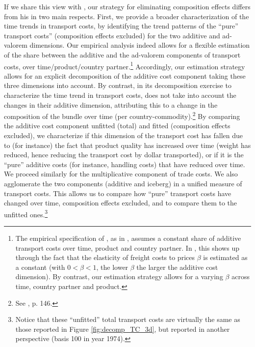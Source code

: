 \documentclass[a4paper,11pt]{article}
\begin{document}
If we share this view with \citet{hummels2007}, our strategy for eliminating composition effects differs from his in two main respects. First, we provide a broader characterization of the time trends in transport costs, by identifying the trend patterns of the ``pure'' transport costs'' (composition effects excluded) for the two additive and ad-valorem dimensions. Our empirical analysis indeed allows for a flexible estimation of the share between the additive and the ad-valorem components of transport costs, over time/product/country partner.\footnote{The empirical specification of \cite{hummels2007}, as in \cite{hummels_skiba}, assumes a constant share of additive transport costs over time, product and country partner. In \cite{hummels_skiba}, this shows up through the fact that the elasticity of freight costs to prices $\beta$ is estimated as a constant (with $0<\beta<1$, the lower $\beta$ the larger the additive cost dimension).
By contrast, our estimation strategy allows for a varying $\beta$ across time, country partner and product.} Accordingly, our estimation strategy allows for an explicit decomposition of the additive cost component taking these three dimensions into account. By contrast, in its decomposition exercise to characterize the time trend in transport costs, \citet{hummels2007} does not take into account the changes in their additive dimension, attributing this to a change in the composition of the bundle over time (per country-commodity).\footnote{See \citet{hummels2007}, p. 146. } By comparing the additive cost component unfitted (total) and fitted (composition effects excluded), we characterize if this dimension of the transport cost has fallen due to (for instance) the fact that product quality has increased over time (weight has reduced, hence reducing the transport cost by dollar transported), or if it is the ``pure'' additive costs (for instance, handling costs) that have reduced over time. We proceed similarly for the multiplicative component of trade costs. We also agglomerate the two components (additive and iceberg) in a unified measure of transport costs. This
allows us to compare how ``pure'' transport costs have changed over time, composition effects excluded, and to compare them to the unfitted ones.\footnote{Notice that these ``unfitted'' total transport costs are virtually the same as those reported in Figure \ref{fig:decomp_TC_3d}, but reported in another perspective (basis 100 in year 1974).}
\end{document}
